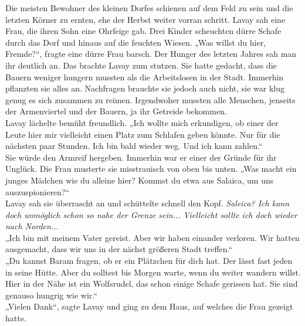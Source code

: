 Die meisten Bewohner des kleinen Dorfes schienen auf dem Feld zu sein und die letzten Körner 
zu ernten, ehe der Herbst weiter vorran schritt. Lavay sah eine Frau, die ihren Sohn eine Ohrfeige 
gab. Drei Kinder scheuchten dürre Schafe durch das Dorf und hinaus auf die feuchten Wiesen. 
„Was willst du hier, Fremde?“, fragte eine dürre Frau barsch. Der Hunger des letzten Jahres 
sah man ihr deutlich an. Das brachte Lavay zum stutzen. Sie hatte gedacht, dass die Bauern weniger 
hungern mussten als die Arbeitslosen in der Stadt. Immerhin pflanzten sie alles an. Nachfragen 
brauchte sie jedoch auch nicht, sie war klug genug es sich zusammen zu reimen. Irgendwoher mussten 
alle Menschen, jenseits der Armenviertel und der Bauern, ja ihr Getreide bekommen.\\
Lavay lächelte bemüht freundlich. „Ich wollte mich erkundigen, ob einer der Leute hier mir 
vielleicht einen Platz zum Schlafen geben könnte. Nur für die nächsten paar Stunden. Ich bin bald 
wieder weg. Und ich kann zahlen.“\\
Sie würde den Armreif hergeben. Immerhin war er einer der Gründe für ihr Unglück. Die Frau musterte 
sie misstrauisch von oben bis unten. „Was macht ein junges Mädchen wie du alleine hier? Kommst du 
etwa aus Salaica, um uns auszuspionieren?“\\
Lavay sah sie überrascht an und schüttelte schnell den Kopf. \textit{Saleica? Ich kann doch 
unmöglich schon so nahe der Grenze sein... Vielleicht sollte ich doch wieder nach Norden...}\\
„Ich bin mit meinem Vater gereist. Aber wir haben einander verloren. Wir hatten ausgemacht, dass 
wir uns in der nächst größeren Stadt treffen.“\\
„Du kannst Baram fragen, ob er ein Plätzchen für dich hat. Der lässt fast jeden in seine Hütte. Aber 
du solltest bis Morgen warte, wenn du weiter wandern willst. Hier in der Nähe ist ein Wolfsrudel, 
das schon einige Schafe gerissen hat. Sie sind genauso hungrig wie wir.“\\
„Vielen Dank“, sagte Lavay und ging zu dem Haus, auf welches die Frau gezeigt hatte.\\

